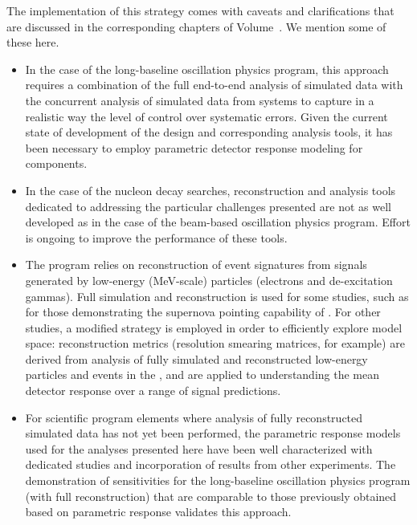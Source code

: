 The implementation of this strategy comes with caveats
and clarifications that are discussed in the corresponding
chapters of Volume~\volnumberphysics{}.   
We mention some of these here.
\begin{itemize}
\item In the case of the long-baseline oscillation physics
      program, this approach requires a combination of the 
      full end-to-end analysis of simulated  data
      with the concurrent analysis of simulated data from
       systems to capture in a realistic way 
      the level of 
      control over systematic errors.  Given the 
      current state of development of the   design and 
      corresponding analysis tools,  it has been necessary to 
      employ parametric detector response modeling for  components. 

\item In the case of the nucleon decay searches, 
      reconstruction and analysis tools dedicated to 
      addressing the particular challenges presented are 
      not as well developed as in the case of the 
      beam-based oscillation physics program. Effort is 
      ongoing to improve the performance of these tools. 

\item The   program relies on 
reconstruction of event signatures from  signals 
generated by low-energy (MeV-scale) particles (electrons 
and de-excitation gammas).  Full simulation and reconstruction 
is used for some studies, such as for those demonstrating 
the supernova pointing capability of .  
For other studies, a modified strategy is employed in order 
to efficiently explore model space:  reconstruction metrics 
(resolution smearing matrices, for example) are derived 
from analysis of fully simulated and reconstructed low-energy 
particles and events in the , and are applied to 
understanding the mean detector response over a range of signal predictions.

\item For scientific program elements where
      analysis of fully reconstructed simulated data has 
      not yet been performed, the parametric response models 
      used for the analyses presented here have
      been well characterized with dedicated studies
      and incorporation of results from other experiments.
      The demonstration of sensitivities for the long-baseline
      oscillation physics program (with full reconstruction) 
      that are comparable to those
      previously obtained based on parametric response
      validates this approach.
\end{itemize}



